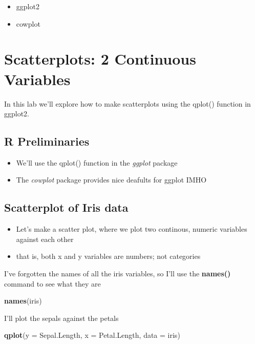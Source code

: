 \documentclass[]{book}
\newenvironment{Shaded}{\begin{snugshade}}{\end{snugshade}}
\newcommand{\KeywordTok}[1]{\textcolor[rgb]{0.13,0.29,0.53}{\textbf{#1}}}
\newcommand{\DataTypeTok}[1]{\textcolor[rgb]{0.13,0.29,0.53}{#1}}
\newcommand{\NormalTok}[1]{#1}
\providecommand{\tightlist}{%
  \setlength{\itemsep}{0pt}\setlength{\parskip}{0pt}}
\theoremstyle{definition}
\theoremstyle{definition}
\theoremstyle{definition}
\theoremstyle{remark}
\begin{document}
\begin{itemize}
\tightlist
\item
  ggplot2
\item
  cowplot
\end{itemize}

\section{Scatterplots: 2 Continuous
Variables}\label{scatterplots-2-continuous-variables}

In this lab we'll explore how to make scatterplots using the qplot()
function in ggplot2.

\subsection{R Preliminaries}\label{r-preliminaries}

\begin{itemize}
\tightlist
\item
  We'll use the qplot() function in the \emph{ggplot} package
\item
  The \emph{cowplot} package provides nice deafults for ggplot IMHO
\end{itemize}

\subsection{Scatterplot of Iris data}\label{scatterplot-of-iris-data}

\begin{itemize}
\tightlist
\item
  Let's make a scatter plot, where we plot two continous, numeric
  variables against each other
\item
  that is, both x and y variables are numbers; not categories
\end{itemize}

I've forgotten the names of all the iris variables, so I'll use the
\textbf{names()} command to see what they are

\begin{Shaded}
\begin{Highlighting}[]
\KeywordTok{names}\NormalTok{(iris)}
\end{Highlighting}
\end{Shaded}

I'll plot the sepals against the petals

\begin{Shaded}
\begin{Highlighting}[]
\KeywordTok{qplot}\NormalTok{(}\DataTypeTok{y =}\NormalTok{ Sepal.Length,}
      \DataTypeTok{x =}\NormalTok{ Petal.Length, }
      \DataTypeTok{data =}\NormalTok{ iris)}
\end{Highlighting}
\end{Shaded}
\end{document}
